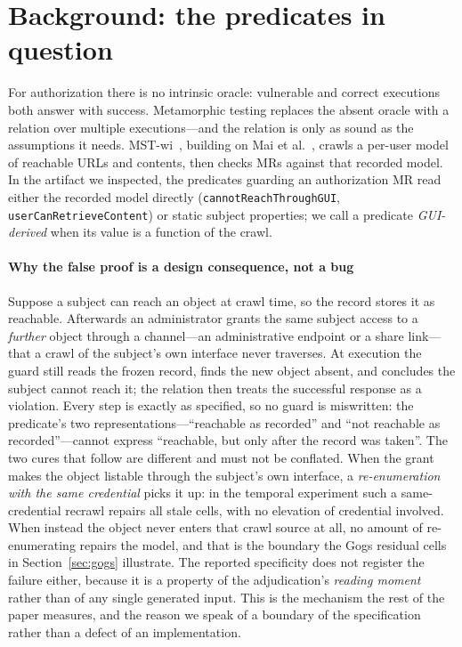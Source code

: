 \section{Background: the predicates in question}
\label{sec:background}

For authorization there is no intrinsic oracle: vulnerable and correct executions
both answer with success. Metamorphic testing replaces the absent oracle with a
relation over multiple executions---and the relation is only as sound as the
assumptions it needs.
\mbox{MST-wi}~\cite{Chaleshtari2022Metamorphic},
building on Mai et al.~\cite{Mai2019Metamorphic}, crawls a per-user model of
reachable URLs and contents, then checks MRs against that recorded model. In the
artifact we inspected, the predicates guarding an authorization MR read either
the recorded model directly (\texttt{cannotReachThroughGUI},
\texttt{userCanRetrieveContent}) or static subject properties; we call a
predicate \emph{GUI-derived} when its value is a function of the crawl.

\paragraph{Why the false proof is a design consequence, not a bug} Suppose a
subject can reach an object at crawl time, so the record stores it as reachable.
Afterwards an administrator grants the same subject access to a \emph{further}
object through a channel---an administrative endpoint or a share link---that a
crawl of the subject's own interface never traverses. At execution the guard
still reads the frozen record, finds the new object absent, and concludes the
subject cannot reach it; the relation then treats the successful response as a
violation. Every step is exactly as specified, so no guard is miswritten: the
predicate's two representations---``reachable as recorded'' and ``not reachable
as recorded''---cannot express ``reachable, but only after the record was
taken''. The two cures that follow are different and must not be conflated. When
the grant makes the object listable through the subject's own interface, a
\emph{re-enumeration with the same credential} picks it up: in the temporal
experiment such a same-credential recrawl repairs all \TmpBothFixed{} stale
cells, with no elevation of credential involved. When instead the object never
enters that crawl source at all, no amount of re-enumerating repairs the model,
and that is the boundary the Gogs residual cells in Section~\ref{sec:gogs}
illustrate. The reported specificity does not register the failure either,
because it is a property of the adjudication's \emph{reading moment} rather than
of any single generated input. This is the mechanism the rest of the paper
measures, and the reason we speak of a boundary of the specification rather than
a defect of an implementation.

